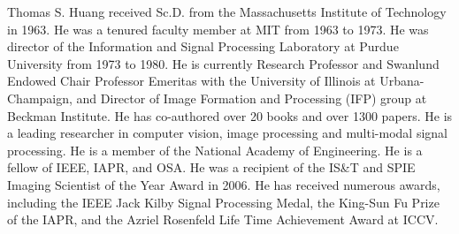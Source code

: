 \documentclass[journal]{IEEEtran}
\begin{document}
\begin{IEEEbiography}
{Thomas S. Huang}
received Sc.D. from the Massachusetts Institute of Technology in 1963. He was a tenured faculty member at MIT from 1963 to 1973. He was director of the Information and Signal Processing Laboratory at Purdue University from 1973 to 1980. He is currently Research Professor and Swanlund Endowed Chair Professor Emeritas with the University of Illinois at Urbana-Champaign, and Director of Image Formation and Processing (IFP) group at Beckman Institute. He has co-authored over 20 books and over 1300 papers. He is a leading researcher in computer vision, image processing and multi-modal signal processing. He is a member of the National Academy of Engineering. He is a fellow of IEEE, IAPR, and OSA. He was a recipient of the IS\&T and SPIE Imaging Scientist of the Year Award in 2006. He has received numerous awards, including the IEEE Jack Kilby Signal Processing Medal, the King-Sun Fu Prize of the IAPR, and the Azriel Rosenfeld Life Time Achievement Award at ICCV. 
\end{IEEEbiography}
\end{document}
